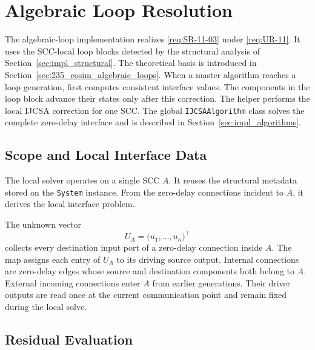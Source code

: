 \section{Algebraic Loop Resolution}
\label{sec:impl_algebraic_loops}

The algebraic-loop implementation realizes \ref{req:SR-11-03} under \ref{req:UR-11}.
It uses the \ac{SCC}-local loop blocks detected by the structural analysis of Section~\ref{sec:impl_structural}.
The theoretical basis is introduced in Section~\ref{sec:235_cosim_algebraic_loops}.
When a master algorithm reaches a loop generation, \syssimx{} first computes consistent interface values.
The components in the loop block advance their states only after this correction.
The  helper performs the local \ac{IJCSA} correction for one \ac{SCC}.
The global \texttt{IJCSAAlgorithm} class solves the complete zero-delay interface and is described in Section~\ref{sec:impl_algorithms}.

\subsection{Scope and Local Interface Data}
\label{sec:impl_algebraic_loops_scope}

The local solver operates on a single \ac{SCC} $A$.
It reuses the structural metadata stored on the \texttt{System} instance.
From the zero-delay connections incident to $A$, it derives the local interface problem.

The unknown vector
\begin{equation}
  U_{A} = \bigl(u_1,\ldots,u_n\bigr)^\top
\end{equation}
collects every destination input port of a zero-delay connection inside $A$.
The  map assigns each entry of $U_A$ to its driving source output.
Internal connections are zero-delay edges whose source and destination components both belong to $A$.
External incoming connections enter $A$ from earlier generations.
Their driver outputs are read once at the current communication point and remain fixed during the local solve.

\subsection{Residual Evaluation}
\label{sec:impl_algebraic_loops_residual}

